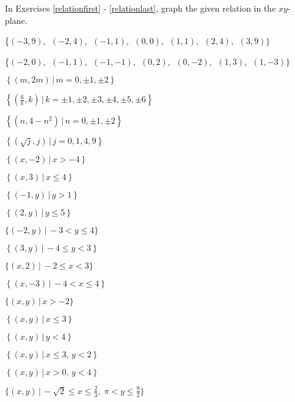 \startexenum

\label{ExercisesforRelations}

In Exercises \ref{relationfirst} - \ref{relationlast}, graph the given relation in the $xy$-plane.

\begin{shortexenum}[MMMMMMM]

\item \{$(-3, 9)$, $\;(-2, 4)$, $\;(-1, 1)$, $\;(0, 0)$, $\;(1, 1)$, $\;(2, 4)$, $\;(3, 9)\}$ \label{relationfirst}
\item \{$(-2, 0)$, $\;(-1, 1)$, $\;(-1, -1)$, $\;(0, 2)$, $\;(0, -2)$, $\;(1, 3)$, $\;(1, -3)\}$
\item  $\left\{ \left(m, 2m \right) \, | \, m = 0, \pm 1, \pm 2 \right\}$
\item  $\left\{ \left(\frac{6}{k}, k \right) \, | \, k = \pm 1, \pm 2, \pm 3, \pm 4, \pm 5, \pm 6 \right\}$
\item  $\left\{ \left(n, 4 - n^2\right) \, | \, n = 0, \pm 1, \pm 2 \right\}$
\item  $\left\{ \left(\sqrt{j}, j \right) \, | \, j = 0, 1, 4, 9 \right\}$
\item  $\left\{ \left(x, -2 \right) \, | \, x > -4 \right\}$
\item  $\left\{ \left(x, 3 \right) \, | \, x \leq 4 \right\}$
\item  $\left\{ \left(-1, y \right) \, | \, y > 1 \right\}$
\item  $\left\{ \left(2, y \right) \, | \, y \leq 5 \right\}$
\item $\{ (-2, y) \, | \, -3 < y \leq 4\}$
\item  $\left\{ \left(3,y \right) \, | \, -4 \leq y < 3 \right\}$
\item $\{ (x, 2) \, | \, -2 \leq x < 3 \}$
\item  $\left\{ \left(x,-3 \right) \, | \, -4 < x \leq 4 \right\}$
\item $\{ (x, y) \, | \, x > -2 \}$
\item  $\left\{ \left(x,y \right) \, | \, x \leq 3 \right\}$
\item  $\left\{ \left(x,y \right) \, | \, y < 4 \right\}$
\item  $\left\{ \left(x,y \right) \, | \, x \leq 3, \, y < 2 \right\}$
\item  $\left\{ \left(x,y \right) \, | \, x > 0, \, y < 4 \right\}$
\item $\{ (x, y) \, | \, -\sqrt{2} \leq x \leq \frac{2}{3}, \; \pi < y \leq \frac{9}{2} \}$ \label{relationlast}

\end{shortexenum}

